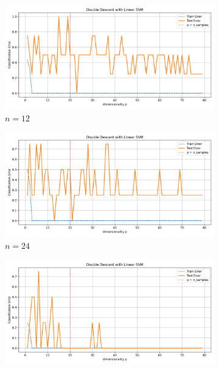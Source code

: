 \documentclass[twoside,10pt]{article}
\begin{document}
\begin{figure}[htb]
  \centering
  \newcommand{\imgwidth}{0.22\textwidth}

  \begin{subfigure}[b]{\imgwidth}
    \includegraphics[width=\linewidth]{img_qq/risk_curve_n5.png}
    \caption{$n=12$}\label{fig:2a1}
  \end{subfigure}%
  \hfill
  \begin{subfigure}[b]{\imgwidth}
    \includegraphics[width=\linewidth]{img_qq/risk_curve_n10.png}
    \caption{$n=24$}\label{fig:2b1}
  \end{subfigure}%
  \hfill
  \begin{subfigure}[b]{\imgwidth}
    \includegraphics[width=\linewidth]{img_qq/risk_curve_n20.png}

\end{subfigure}
\end{figure}
\end{document}
